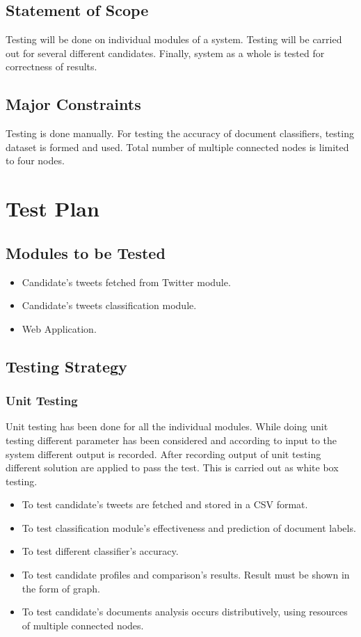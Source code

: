 \documentclass[oneside,a4paper,12pt]{pictreport}
\begin{document}
\subsection{Statement of Scope}
Testing will be done on individual modules of a system. Testing will be carried out for several different candidates. Finally, system as a whole is tested for correctness of results. 

\subsection{Major Constraints}
Testing is done manually. For testing the accuracy of document classifiers, testing dataset is formed and used. Total number of multiple connected nodes is limited to four nodes.

\section{Test Plan}
\subsection{Modules to be Tested}
\begin{itemize}
\item Candidate's tweets fetched from Twitter module.
\item Candidate's tweets classification module.
\item Web Application.
\end{itemize}

\subsection{Testing Strategy}
\subsubsection{Unit Testing}
Unit testing has been done for all the individual modules. While doing unit testing different parameter has been considered and according to input to the system different output is recorded. After recording output of unit testing different solution are applied to pass the test. This is carried out as white box testing.
\begin{itemize}
\item To test candidate's tweets are fetched and stored in a CSV format.
\item To test classification module's effectiveness and prediction of document labels.
\item To test different classifier's accuracy.
\item To test candidate profiles and comparison's results. Result must be shown in the form of graph.
\item To test candidate's documents analysis occurs distributively, using resources of multiple connected nodes. 
\end{itemize}
\end{document}
